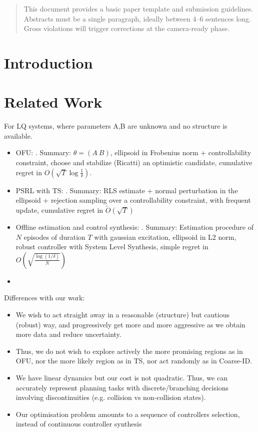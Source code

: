 \documentclass{article}
\begin{document}
	\begin{abstract}
		This document provides a basic paper template and submission guidelines.
		Abstracts must be a single paragraph, ideally between 4--6 sentences long.
		Gross violations will trigger corrections at the camera-ready phase.
	\end{abstract}

\section{Introduction}

\section{Related Work}

For LQ systems, where parameters A,B are unknown and no structure is available.
\begin{itemize}
    \item OFU: \citep{abbasi-yadkori11a}. Summary: $\theta=(A~B)$, ellipsoid in Frobenius norm + controllability constraint, choose and stabilize (Ricatti) an optimistic candidate, cumulative regret in $O(\sqrt{T}\log\frac{1}{\delta})$.
    \item PSRL with TS: \citep{abeille18a}. Summary: RLS estimate + normal perturbation in the ellipsoid + rejection sampling over a controllability constraint, with frequent update, cumulative regret in $\tilde{O}(\sqrt{T})$
    \item Offline estimation and control synthesis: \citep{Dean2017}. Summary: Estimation procedure of $N$ episodes of duration $T$ with gaussian excitation, ellipsoid in L2 norm, robust controller with System Level Synthesis, simple regret in $O(\sqrt{\frac{\log(1/\delta)}{N}})$
    \item \citep{Dean2018}
\end{itemize}

Differences with our work:
\begin{itemize}
    \item We wish to act straight away in a reasonable (structure) but cautious (robust) way, and progressively get more and more aggressive as we obtain more data and reduce uncertainty.
    \item Thus, we do not wish to explore actively the more promising regions as in OFU, nor the more likely region as in TS, nor act randomly as in Coarse-ID.
    \item We have linear dynamics but our cost is not quadratic. Thus, we can accurately represent planning tasks with discrete/branching decisions involving discontinuities (e.g. collision vs non-collision states).
    \item Our optimisation problem amounts to a sequence of controllers selection, instead of continuous controller synthesis
    
\end{itemize}
\end{document}
